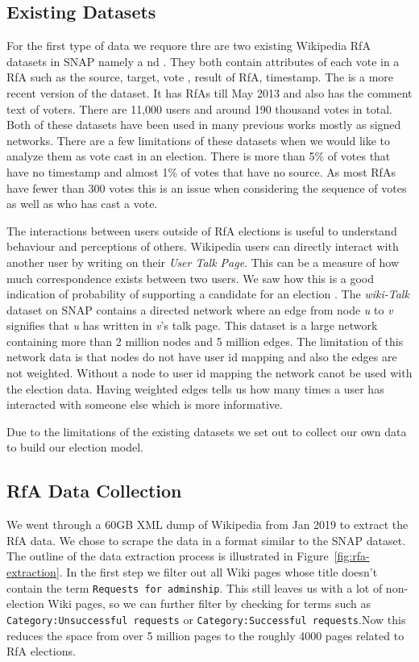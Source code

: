 \subsection{Existing Datasets}
For the first type of data we requore thre are two existing Wikipedia RfA datasets in SNAP namely \wikielect a
nd \wikirfa. They both contain attributes of each vote in a RfA such as the source, target, vote , result of RfA, timestamp. The \wikirfa is a more recent version of the \wikielect dataset. It has RfAs till May 2013 and also has the comment text of voters. There are 11,000 users and around 190 thousand votes in total. Both of these datasets have been used in many previous works mostly as signed networks. There are a few limitations of these datasets when we would like to analyze them as vote cast in an election. There is more than 5\% of \wikirfa votes that have no timestamp and almost 1\% of votes that have no source. As most RfAs have fewer than 300 votes this is an issue when considering the sequence of votes as well as who has cast a vote.
\smallskip

The interactions between users outside of RfA elections is useful to understand behaviour and perceptions of others. Wikipedia users can directly interact with another user by writing on their \textit{User Talk Page}. This can be a measure of how much correspondence exists between two users. We saw how this is a good indication of probability of supporting a candidate for an election \cite{leskovec2010governance}. The \textit{wiki-Talk} dataset on SNAP contains a directed network where an edge from node \textit{u} to \textit{v} signifies that \textit{u} has written in \textit{v}'s talk page. This dataset is a large network containing more than 2 million nodes and 5 million edges. The limitation of this network data is that nodes do not have user id mapping and also the edges are not weighted. Without a node to user id mapping the network canot be used with the election data. Having weighted edges tells us how many times a user has interacted with someone else which is more informative. 
\smallskip

Due to the limitations of the existing datasets we set out to collect our own data to build our election model.

\subsection{RfA Data Collection}

We went through a 60GB XML dump of Wikipedia from Jan 2019 to extract the RfA data. We chose to scrape the data in a format similar to the SNAP \wikirfa dataset. The outline of the data extraction process is illustrated in Figure~\ref{fig:rfa-extraction}. In the first step we filter out all Wiki pages whose title doesn't contain the term \texttt{Requests for adminship}. This still leaves us with a lot of non-election Wiki pages, so we can further filter by checking for terms such as \texttt{Category:Unsuccessful requests} or \texttt{Category:Successful requests}.Now this reduces the space from over 5 million pages to the roughly 4000 pages related to RfA elections.
\smallskip

